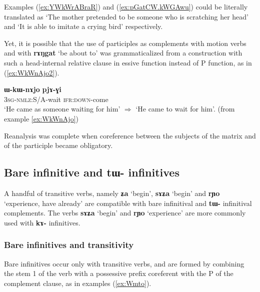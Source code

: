 \documentclass[oldfontcommands,oneside,a4paper,11pt]{article}
\newcommand{\ipa}[1]{\textbf{\phon#1}} %
\newcommand{\jpg}[2]{\ipa{#1} `#2'} %
\begin{document}
Examples (\ref{ex:YWkWrABraR}) and (\ref{ex:pGatCW.kWGAwu}) could be literally translated as `The mother pretended to be someone who is scratching her head' and `It is able to imitate a crying bird' respectively.

Yet, it is possible that the use of participles as complements with motion verbs and with \jpg{rɤŋgat}{be about to} was grammaticalized from a construction with such a head-internal relative clause in essive function instead of P function, as in (\ref{ex:WkWnAjo2}).

\begin{exe}
\ex \label{ex:WkWnAjo2}
\gll 	\ipa{ɯ-kɯ-nɤjo} 	\ipa{pjɤ-ɣi} \\
 \textsc{3sg-nmlz:S/A}-wait \textsc{ifr:down}-come \\
\glt *`He came as someone waiting for him' $\Rightarrow$ `He came to wait for him'. (from example \ref{ex:WkWnAjo})
\end{exe}

Reanalysis was complete when coreference between the subjects of the matrix and of the participle became obligatory.


 \subsection{Bare infinitive and \ipa{tɯ-} infinitives} \label{sec:bareinf}
A handful of transitive verbs, namely \jpg{ʑa}{begin}, \jpg{sɤʑa}{begin} and \jpg{rɲo}{experience, have already} are compatible with bare infinitival and \ipa{tɯ-} infinitival complements. The verbs \jpg{sɤʑa}{begin} and \jpg{rɲo}{experience} are more commonly used with \ipa{kɤ-} infinitives.


\subsubsection{Bare infinitives and transitivity}
Bare infinitives occur only with transitive verbs, and are formed by combining the stem 1 of the verb with a possessive prefix coreferent with the P of the complement clause, as in examples (\ref{ex:Wmto}).
\end{document}
